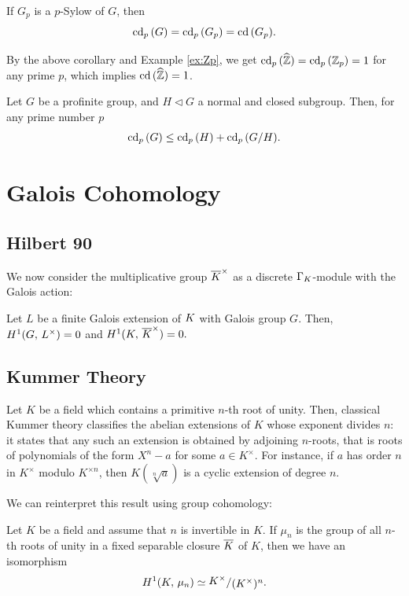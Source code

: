 \documentclass[a4paper, oneside]{memoir}
\begin{document}
\begin{corollary}
	If $G_p$ is a $p$-Sylow of $G$, then
	\[
		\operatorname{cd}_p{(G)}= \operatorname{cd}_p{(G_p)} = \operatorname{cd}{(G_p)}.
	\]
\end{corollary}

\begin{example}\label{ex:Zhat}
	By the above corollary and Example \ref{ex:Zp}, we get $\operatorname{cd}_p{(\widehat{\mathbb{Z}})}=\operatorname{cd}_p{(\mathbb{Z}_p)}=1$ for any prime $p$, which implies $\operatorname{cd}{(\widehat{\mathbb{Z}})}=1$.
\end{example}

\begin{proposition}\label{prop:CdIneq}
	Let $G$ be a profinite group, and $H \lhd G$ a normal and closed subgroup. Then, for any prime number $p$
	\[
		\operatorname{cd}_p{(G)} \leq \operatorname{cd}_p{(H)} + \operatorname{cd}_p{(G/H)}.
	\]

\end{proposition}

\section{Galois Cohomology}


\subsection{Hilbert 90}

We now consider the multiplicative group $\overline{K}^\times$ as a discrete $\Gamma_K$-module with the Galois action:

\begin{theorem}[Hilbert 90]
	Let $L$ be a finite Galois extension of $K$ with Galois group $G$. Then, $H^{1}( G, \, L^\times )=0$ and $H^{1}( K, \, \overline{K}^\times ) = 0.$
\end{theorem}

\subsection{Kummer Theory}

Let $K$ be a field which contains a primitive $n$-th root of unity. Then, classical Kummer theory classifies the abelian extensions of $K$ whose exponent divides $n$: it states that any such an extension is obtained by adjoining $n$-roots, that is roots of polynomials of the form $X^n-a$ for some $a\in K^\times$. For instance, if $a$ has order $n$ in $K^\times$ modulo $K^{\times n}$, then $K(\sqrt[n]{a})$ is a cyclic extension of degree $n$.

We can reinterpret this result using group cohomology:
\begin{proposition}
	Let $K$ be a field and assume that $n$ is invertible in $K$.
	If $\mu_n$ is the group of all $n$-th roots of unity in a fixed separable closure $\overline{K}$ of $K$, then we have an isomorphism
	\begin{equation}\label{eq:Kummer}
		\H{1}{\K}{\mu_n}\simeq \ssfrac{\K^\times}{(\K^\times)^n}.
	\end{equation}
\end{proposition}
\end{document}
